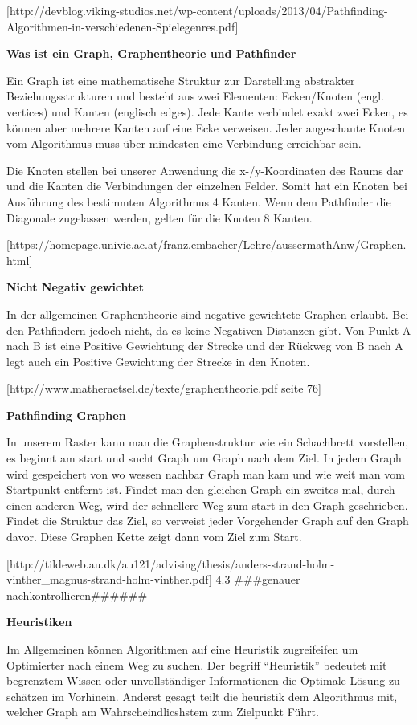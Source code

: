 {[}http://devblog.viking-studios.net/wp-content/uploads/2013/04/Pathfinding-Algorithmen-in-verschiedenen-Spielegenres.pdf{]}

\textbf{Was ist ein Graph, Graphentheorie und Pathfinder}

Ein Graph ist eine mathematische Struktur zur Darstellung abstrakter
Beziehungsstrukturen und besteht aus zwei Elementen: Ecken/Knoten (engl.
vertices) und Kanten (englisch edges). Jede Kante verbindet exakt zwei
Ecken, es können aber mehrere Kanten auf eine Ecke verweisen. Jeder
angeschaute Knoten vom Algorithmus muss über mindesten eine Verbindung
erreichbar sein.

Die Knoten stellen bei unserer Anwendung die x-/y-Koordinaten des Raums
dar und die Kanten die Verbindungen der einzelnen Felder. Somit hat ein
Knoten bei Ausführung des bestimmten Algorithmus 4 Kanten. Wenn dem
Pathfinder die Diagonale zugelassen werden, gelten für die Knoten 8
Kanten.

{[}https://homepage.univie.ac.at/franz.embacher/Lehre/aussermathAnw/Graphen.html{]}

\textbf{Nicht Negativ gewichtet}

In der allgemeinen Graphentheorie sind negative gewichtete Graphen
erlaubt. Bei den Pathfindern jedoch nicht, da es keine Negativen
Distanzen gibt. Von Punkt A nach B ist eine Positive Gewichtung der
Strecke und der Rückweg von B nach A legt auch ein Positive Gewichtung
der Strecke in den Knoten.

{[}http://www.matheraetsel.de/texte/graphentheorie.pdf seite 76{]}

\textbf{Pathfinding Graphen}

In unserem Raster kann man die Graphenstruktur wie ein Schachbrett
vorstellen, es beginnt am start und sucht Graph um Graph nach dem Ziel.
In jedem Graph wird gespeichert von wo wessen nachbar Graph man kam und
wie weit man vom Startpunkt entfernt ist. Findet man den gleichen Graph
ein zweites mal, durch einen anderen Weg, wird der schnellere Weg zum
start in den Graph geschrieben. Findet die Struktur das Ziel, so
verweist jeder Vorgehender Graph auf den Graph davor. Diese Graphen
Kette zeigt dann vom Ziel zum Start.

{[}http://tildeweb.au.dk/au121/advising/thesis/anders-strand-holm-vinther\_magnus-strand-holm-vinther.pdf{]}
4.3 \#\#\#genauer nachkontrollieren\#\#\#\#\#\#

\textbf{Heuristiken}

Im Allgemeinen können Algorithmen auf eine Heuristik zugreifeifen um
Optimierter nach einem Weg zu suchen. Der begriff ``Heuristik'' bedeutet
mit begrenztem Wissen oder unvollständiger Informationen die Optimale
Lösung zu schätzen im Vorhinein. Anderst gesagt teilt die heuristik dem
Algorithmus mit, welcher Graph am Wahrscheindlicshstem zum Zielpunkt
Führt.


